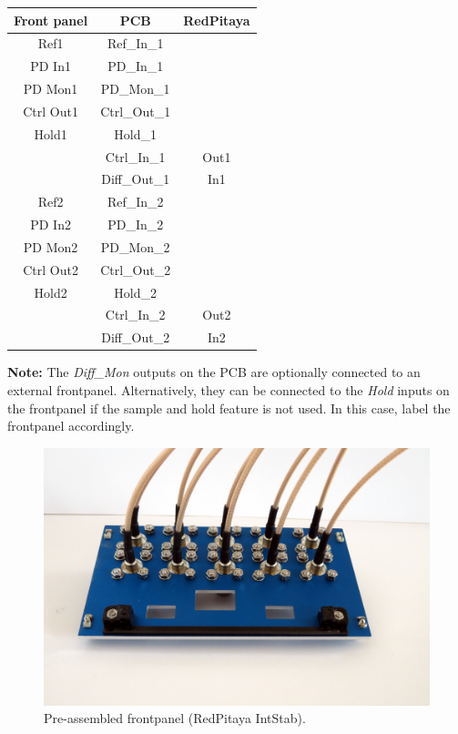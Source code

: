\documentclass[twoside,a4paper]{refart}
\begin{document}
\begin{tabular}{|c|c|c|}\hline
\textbf{Front panel} & \textbf{PCB} 			& \textbf{RedPitaya}	\\\hline
Ref1		& Ref\_In\_1	& 	 		\\\hline	
PD In1		& PD\_In\_1		&			\\\hline
PD Mon1		& PD\_Mon\_1	&			\\\hline
Ctrl Out1	& Ctrl\_Out\_1	&			\\\hline
Hold1		& Hold\_1		& 			\\\hline
			& Ctrl\_In\_1	& Out1		\\\hline
			& Diff\_Out\_1	& In1		\\\hline
Ref2		& Ref\_In\_2	& 	 		\\\hline	
PD In2		& PD\_In\_2		&			\\\hline
PD Mon2		& PD\_Mon\_2	&			\\\hline
Ctrl Out2	& Ctrl\_Out\_2	&			\\\hline
Hold2		& Hold\_2		& 			\\\hline
 			& Ctrl\_In\_2	& Out2		\\\hline
 			& Diff\_Out\_2	& In2		\\\hline
\end{tabular}

\textbf{Note:} The \textit{Diff\_Mon} outputs on the PCB are optionally connected to an external frontpanel. Alternatively, they can be connected to the \textit{Hold} inputs on the frontpanel if the sample and hold feature is not used. In this case, label the frontpanel accordingly.

\begin{figure}[H]
	\includegraphics[width=\textwidth]{fig/front_panel.png}
	\caption{Pre-assembled frontpanel (RedPitaya IntStab).\label{fig:front_panel}}
\end{figure}
\end{document}

